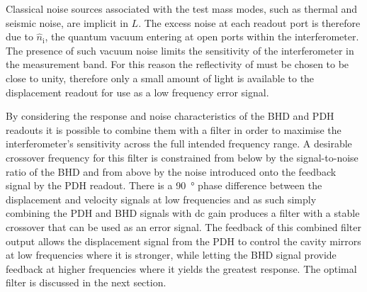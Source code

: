 Classical noise sources associated with the test mass modes, such as thermal and seismic noise, are implicit in $L$. The excess noise at each readout port is therefore due to $\hat{n}_{\textrm{i}}$, the quantum vacuum entering at open ports within the interferometer. The presence of such vacuum noise limits the sensitivity of the interferometer in the measurement band. For this reason the reflectivity of \MINT{} must be chosen to be close to unity, therefore only a small amount of light is available to the displacement readout for use as a low frequency error signal.

By considering the response and noise characteristics of the \gls{BHD} and \gls{PDH} readouts it is possible to combine them with a filter in order to maximise the interferometer's sensitivity across the full intended frequency range. A desirable crossover frequency for this filter is constrained from below by the signal-to-noise ratio of the \gls{BHD} and from above by the noise introduced onto the feedback signal by the \gls{PDH} readout. There is a \SI{90}{\degree} phase difference between the displacement and velocity signals at low frequencies and as such simply combining the \gls{PDH} and \gls{BHD} signals with dc gain produces a filter with a stable crossover that can be used as an error signal. The feedback of this combined filter output allows the displacement signal from the \gls{PDH} to control the cavity mirrors at low frequencies where it is stronger, while letting the \gls{BHD} signal provide feedback at higher frequencies where it yields the greatest response. The optimal filter is discussed in the next section.

